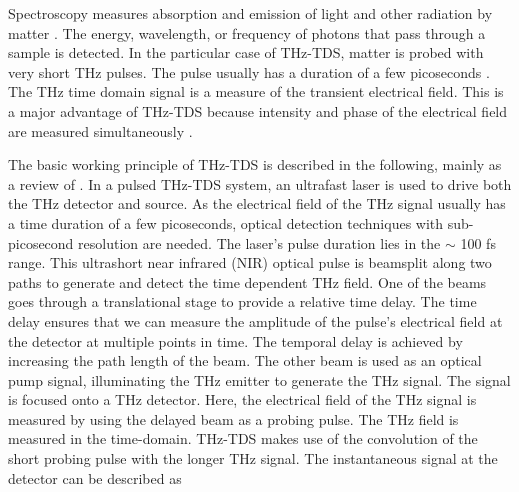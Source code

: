 Spectroscopy measures absorption and emission of light and other radiation by matter \cite{atascientificUnderstandingSpectrometrySpectroscopy2020}. The energy, wavelength, or frequency of photons that pass through a sample is detected. In the particular case of THz-TDS, matter is probed with very short THz pulses. The pulse usually has a duration of a few picoseconds \cite{neuTutorialIntroductionTerahertz2018}. The THz time domain signal is a measure of the transient electrical field. This is a major advantage of THz-TDS because intensity and phase of the electrical field are measured simultaneously \cite{zhaoPrincipleTerahertzTimeDomain2023}.


The basic working principle of THz-TDS is described in the following, mainly as a review of \cite{neuTutorialIntroductionTerahertz2018,PrinciplesTerahertzScience2009,nandiErAsInAlGaAsPhotoconductors2021}. 
In a pulsed THz-TDS system, an ultrafast laser is used to drive both the THz detector and source. As the electrical field of the THz signal usually has a time duration of a few picoseconds, optical detection techniques with sub-picosecond resolution are needed. The laser's pulse duration lies in the $\sim$ \num{100} \si{\femto\s} range. This ultrashort near infrared (NIR) optical pulse is beamsplit along two paths to generate and detect the time dependent THz field. One of the beams goes through a translational stage to provide a relative time delay. The time delay ensures that we can measure the amplitude of the pulse's electrical field at the detector at multiple points in time. The temporal delay is achieved by increasing the path length of the beam. 
The other beam is used as an optical pump signal, illuminating the THz emitter to generate the THz signal. The signal is focused onto a THz detector. Here, the electrical field of the THz signal is measured by using the delayed beam as a probing pulse. The THz field is measured in the time-domain. THz-TDS makes use of the convolution of the short probing pulse with the longer THz signal. The instantaneous signal at the detector can be described as 

